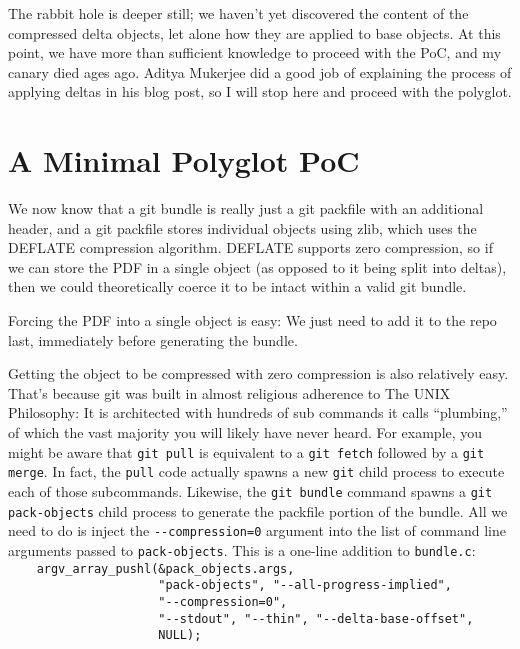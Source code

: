 \documentclass{article}
\begin{document}
The rabbit hole is deeper still; we haven't yet discovered the content
of the compressed delta objects, let alone how they are applied to
base objects.  At this point, we have more than sufficient knowledge
to proceed with the PoC, and my canary died ages ago. Aditya Mukerjee
did a good job of explaining the process of applying deltas in his
blog post, so I will stop here and proceed with the polyglot.

\section{A Minimal Polyglot PoC}

We now know that a git bundle is really just a git packfile with an
additional header, and a git packfile stores individual objects using
zlib, which uses the DEFLATE compression algorithm. DEFLATE supports
zero compression, so if we can store the PDF in a single object (as
opposed to it being split into deltas), then we could theoretically
coerce it to be intact within a valid git bundle.

Forcing the PDF into a single object is easy: We just need to add it
to the repo last, immediately before generating the bundle.

Getting the object to be compressed with zero compression is also
relatively easy.  That's because git was built in almost religious
adherence to The UNIX Philosophy: It is architected with hundreds of
sub commands it calls ``plumbing,'' of which the vast majority you
will likely have never heard. For example, you might be aware
that \texttt{git pull} is equivalent to a \texttt{git fetch} followed
by a \texttt{git merge}. In fact, the \texttt{pull} code actually
spawns a new \texttt{git} child process to execute each of those
subcommands. Likewise, the \texttt{git bundle} command spawns
a \texttt{git pack-objects} child process to generate the packfile
portion of the bundle.  All we need to do is inject
the \texttt{-\relax-compression=0} argument into the list of command line
arguments passed to \texttt{pack-objects}.  This is a one-line
addition to \texttt{bundle.c}:\\ {\footnotesize {\color{gray}
\verb|    argv_array_pushl(&pack_objects.args,|\\
\verb|                     "pack-objects", "--all-progress-implied",|}\\
\verb|                     "--compression=0",|\\
{\color{gray}
\verb|                     "--stdout", "--thin", "--delta-base-offset",|\\
\verb|                     NULL);|
}}
\end{document}
